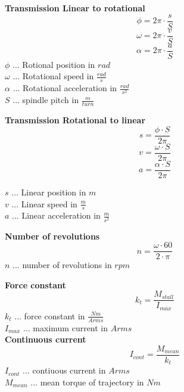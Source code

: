 	
	\begin{tcolorbox}[title=Position/Speed/Acceleration]
		\begin{minipage}[t]{0.499\textwidth}
			\textbf{Transmission Linear to rotational}
			\[\phi=2\pi \cdot\frac{s}{S} \]
			\[\omega=2\pi \cdot\frac{v}{S} \]
			\[\alpha=2\pi \cdot\frac{a}{S} \]
			$ \phi $ ... Rotional position in $ rad $\\
			$ \omega $ ... Rotational speed in $ \frac{rad}{s} $\\
			$ \alpha $ ... Rotational acceleration in $ \frac{rad}{s^{2}} $\\
			$ S $ ... spindle pitch in $ \frac{m}{turn} $\\
		\end{minipage}
		\begin{minipage}[t]{0.499\textwidth}
			\textbf{Transmission Rotational to linear}
			\[s=\frac{\phi\cdot S}{2\pi} \]
			\[v=\frac{\omega\cdot S}{2\pi} \]
			\[a=\frac{\alpha\cdot S}{2\pi} \]
			
			$ s $ ... Linear position in $ m $\\
			$ v $ ... Linear speed in $ \frac{m}{s} $\\
			$ a $ ... Linear acceleration in $ \frac{m}{s^{2}} $\\
		\end{minipage}

		\textbf{Number of revolutions}
		\[n = \frac{\omega \cdot 60}{2 \cdot \pi} \]
		$ n $ ... number of revolutions in $ rpm $
	\end{tcolorbox}

	\begin{tcolorbox}[title=Motor related]
		\textbf{Force constant}
		\[k_{t}= \frac{M_{stall}}{I_{max}} \]
		$ k_{t} $ ... force constant in $ \frac{Nm}{Arms} $\\
		$ I_{max} $ ... maximum current in $ Arms $\\
		
		\textbf{Continuous current}
		\[I_{cont} = \frac{M_{mean}}{k_{t}}\]
		$ I_{cont} $ ... contiuous current in $ Arms $\\
		$ M_{mean} $ ... mean torque of trajectory in $ Nm $\\
		

	\end{tcolorbox}

